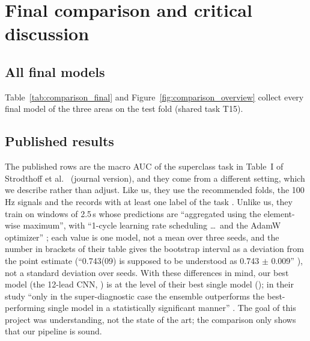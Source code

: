 \section{Final comparison and critical discussion}\label{sec:discussion}

\subsection{All final models}

Table~\ref{tab:comparison_final} and Figure~\ref{fig:comparison_overview} collect every final model of
the three areas on the test fold (shared task T15).




\subsection{Published results}\label{sec:published}

The published rows are the macro AUC of the superclass task in Table~I of Strodthoff et al.\
\cite[p.~1523]{strodthoff2021deep} (journal version), and they come from a different setting, which we
describe rather than adjust. Like us, they use the recommended folds, the 100\,Hz signals and the
records with at least one label of the task \cite[pp.~1520--1523]{strodthoff2021deep}. Unlike us, they
train on windows of 2.5\,s whose predictions are ``aggregated using the element-wise maximum'', with
``1-cycle learning rate scheduling \ldots\ and the AdamW optimizer'' \cite[p.~1521]{strodthoff2021deep};
each value is one model, not a mean over three seeds, and the number in brackets of their table gives
the bootstrap interval as a deviation from the point estimate (``0.743(09) is supposed to be understood as
0.743 $\pm$ 0.009'' \cite[p.~1522]{strodthoff2021deep}), not a standard deviation over seeds. With these differences in mind, our best model (the 12-lead CNN,
\comparisonTestAurocMeanTwelveCnn{}) is at the level of their best single model
(\comparisonPublishedStrodthoffResnetOneDWang{}); in their study ``only in the super-diagnostic case the
ensemble outperforms the best-performing single model in a statistically significant manner''
\cite[p.~1523]{strodthoff2021deep}. The goal of this project was understanding, not the
state of the art; the comparison only shows that our pipeline is sound.

